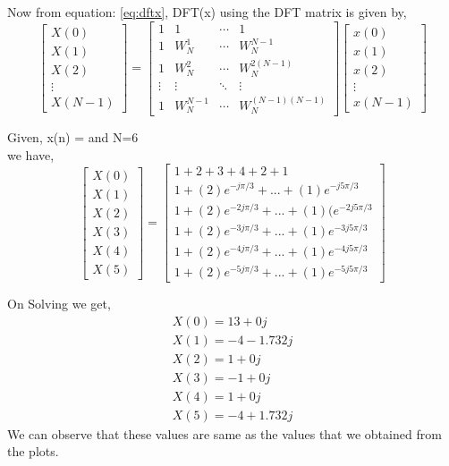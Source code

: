 \documentclass[journal,12pt,twocolumn]{IEEEtran}
\renewcommand\thesection{\arabic{section}}
\begin{document}
\begin{enumerate}[label=\thesection.\arabic*.,ref=\thesection.\theenumi]
Now from equation: \eqref{eq:dftx}, DFT(x) using the DFT matrix is given by,
\begin{equation}
 \begin{bmatrix} X(0) \\ X(1) \\ X(2) \\ \vdots \\ X(N-1) \end{bmatrix}
=
\begin{bmatrix}
1 & 1 & \cdots & 1 \\
1 & W_N^1& \cdots & W_N^{N-1}\\
1 & W_N^2 & \cdots & W_N^{2(N-1)}\\
\vdots & \vdots & \ddots & \vdots \\
1 & W_N^{N-1} & \cdots &W_N^{(N-1)(N-1)}
\end{bmatrix}
\begin{bmatrix}
x(0) \\ x(1) \\ x(2) \\ \vdots \\x(N-1)
\end{bmatrix}
\end{equation}
\bigskip

Given,  x(n) =  and N=6\\
we have,
\begin{equation}
\begin{bmatrix} X(0) \\ X(1) \\ X(2) \\ X(3) \\ X(4) \\ X(5) \end{bmatrix}
=
\begin{bmatrix}
1 +2+3+4+2+1 \\ 1+ (2)e^{-j\pi /3} + ... + (1)e^{-j5\pi /3}\\ 1 + (2)e^{-2j\pi /3} + ... +(1)(e^{-2j5\pi /3}\\ 1 + (2)e^{-3j\pi /3} + ... + (1)e^{-3j5\pi /3}\\ 1 + (2)e^{-4j\pi /3} + ... + (1)e^{-4j5\pi /3}\\ 1 + (2)e^{-5j\pi /3} + ... + (1)e^{-5j5\pi /3}
\end{bmatrix}
\end{equation}
\bigskip

On Solving we get,
\begin{align}
    X(0)= 13 + 0j \\
    X(1)= -4 - 1.732j \\
    X(2)= 1 + 0j \\
    X(3)= -1 + 0j \\
    X(4)= 1 + 0j \\
    X(5)= -4 + 1.732j
\end{align}
We can observe that these values are same as the values that we obtained from the plots.
\bigskip



\end{enumerate}
\end{document}
